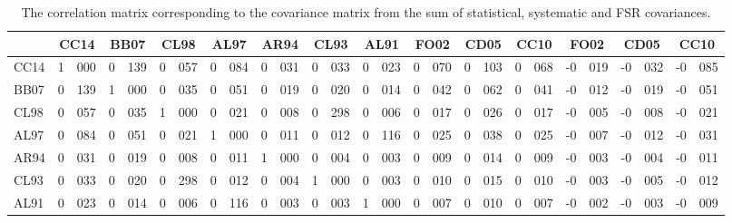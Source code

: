 \begin{table}
  \centering 
  \caption{The correlation matrix corresponding to the covariance matrix from the sum of statistical,
  systematic and FSR covariances.}\label{tab:correlations}
  \small
\begin{tabular}{lr@{.}lr@{.}lr@{.}lr@{.}lr@{.}lr@{.}lr@{.}lr@{.}lr@{.}lr@{.}lr@{.}lr@{.}lr@{.}l}
\hline\hline
           & \multicolumn{2}{c}{CC14}
                   & \multicolumn{2}{c}{BB07}
                           & \multicolumn{2}{c}{CL98}
                                   & \multicolumn{2}{c}{AL97}
                                           & \multicolumn{2}{c}{AR94} 
                                                   & \multicolumn{2}{c}{CL93} 
                                                           & \multicolumn{2}{c}{AL91} 
                                                                   & \multicolumn{2}{c}{FO02} 
                                                                           & \multicolumn{2}{c}{CD05} 
                                                                                   & \multicolumn{2}{c}{CC10} 
                                                                                           & \multicolumn{2}{c}{FO02}
                                                                                                    & \multicolumn{2}{c}{CD05} 
                                                                                                            & \multicolumn{2}{c}{CC10} \\ \hline
CC14 & 1&000 & 0&139 & 0&057 & 0&084 & 0&031 & 0&033 & 0&023 & 0&070 & 0&103 & 0&068 &-0&019 &-0&032 &-0&085 \\
BB07 & 0&139 & 1&000 & 0&035 & 0&051 & 0&019 & 0&020 & 0&014 & 0&042 & 0&062 & 0&041 &-0&012 &-0&019 &-0&051 \\
CL98 & 0&057 & 0&035 & 1&000 & 0&021 & 0&008 & 0&298 & 0&006 & 0&017 & 0&026 & 0&017 &-0&005 &-0&008 &-0&021 \\
AL97 & 0&084 & 0&051 & 0&021 & 1&000 & 0&011 & 0&012 & 0&116 & 0&025 & 0&038 & 0&025 &-0&007 &-0&012 &-0&031 \\
AR94 & 0&031 & 0&019 & 0&008 & 0&011 & 1&000 & 0&004 & 0&003 & 0&009 & 0&014 & 0&009 &-0&003 &-0&004 &-0&011 \\
CL93 & 0&033 & 0&020 & 0&298 & 0&012 & 0&004 & 1&000 & 0&003 & 0&010 & 0&015 & 0&010 &-0&003 &-0&005 &-0&012 \\
AL91 & 0&023 & 0&014 & 0&006 & 0&116 & 0&003 & 0&003 & 1&000 & 0&007 & 0&010 & 0&007 &-0&002 &-0&003 &-0&009 \\

\end{tabular}
\end{table}
